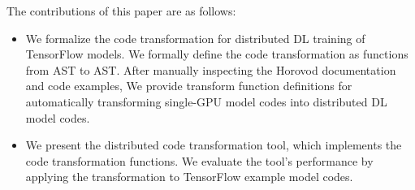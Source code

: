 The contributions of this paper are as follows:

\begin{itemize}
  \item We formalize the code transformation for distributed DL training
        of TensorFlow models. We formally define the code transformation
        as functions from AST to AST. After manually inspecting
        the Horovod documentation and code examples,
        We provide transform function definitions for 
        automatically transforming single-GPU model codes into
        distributed DL model codes.

  \item We present the distributed code transformation tool, which implements
        the code transformation functions. We evaluate the tool's performance
        by applying the transformation to TensorFlow example model codes.
\end{itemize}
